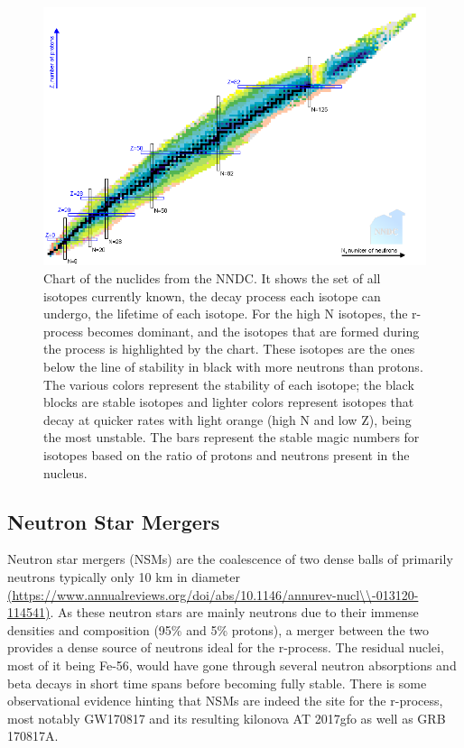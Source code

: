 \documentclass[11pt,a4paper]{article}
\begin{document}
\begin{figure}[h!]
  \includegraphics[width=1\textwidth , scale = .5]{nuclides_chart.png}
  \caption{Chart of the nuclides from the NNDC. It shows the set of all isotopes currently known, the decay process each isotope can undergo, the lifetime of each isotope. For the high N isotopes, the r-process becomes dominant, and the isotopes that are formed during the process is highlighted by the chart. These isotopes are the ones below the line of stability in black with more neutrons than protons. The various colors represent the stability of each isotope; the black blocks are stable isotopes and lighter colors represent isotopes that decay at quicker rates with light orange (high N and low Z), being the most unstable. The bars represent the stable magic numbers for isotopes based on the ratio of protons and neutrons present in the nucleus.}
\end{figure}

\subsection{Neutron Star Mergers}

Neutron star mergers (NSMs) are the coalescence of two dense balls of primarily neutrons typically only 10 km in diameter \url{(https://www.annualreviews.org/doi/abs/10.1146/annurev-nucl\\-013120-114541)}. As these neutron stars are mainly neutrons due to their immense densities and composition (95\% and 5\% protons), a merger between the two provides a dense source of neutrons ideal for the r-process. The residual nuclei, most of it being Fe-56, would have gone through several neutron absorptions and beta decays in short time spans before becoming fully stable. There is some observational evidence hinting that NSMs are indeed the site for the r-process, most notably GW170817 and its resulting kilonova AT 2017gfo as well as GRB 170817A. 
\end{document}
